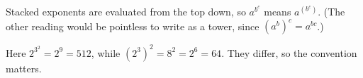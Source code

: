Stacked exponents are evaluated from the top down, so $a^{b^c}$ means $a^{\left(b^c\right)}$. (The other reading would be pointless to write as a tower, since $\left(a^b\right)^c=a^{bc}$.)

Here $2^{3^2}=2^{9}=\boxed{512}$, while $\left(2^3\right)^2=8^2=2^6=\boxed{64}$. They differ, so the convention matters.
